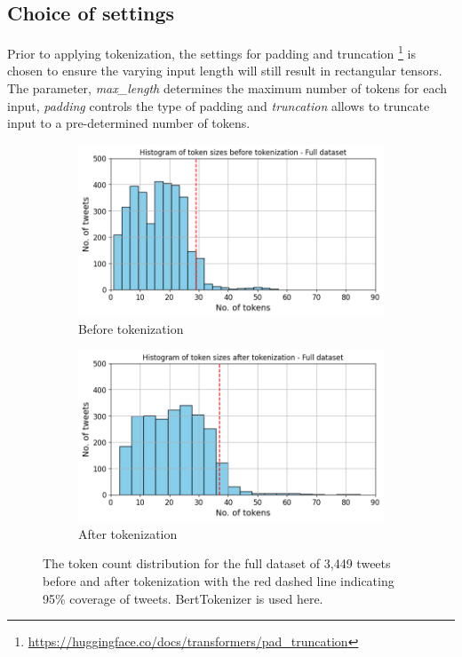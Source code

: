 \subsection{Choice of settings}
Prior to applying tokenization, the settings for padding and truncation \footnote{\url{https://huggingface.co/docs/transformers/pad_truncation}} is chosen to ensure the varying input length will still result in rectangular tensors. The parameter, \textit{max\_length} determines the maximum number of tokens for each input, \textit{padding} controls the type of padding and \textit{truncation} allows to truncate input to a pre-determined number of tokens.\newline

\begin{figure}[htbp]
    \centering
    \captionsetup{font=small}
    \begin{subfigure}[b]{0.48\textwidth}
        \includegraphics[width=\textwidth]{figures/token_hist.png}
        \caption{Before tokenization}
        \label{fig: token_hist}
    \end{subfigure}
    \hfill
    \begin{subfigure}[b]{0.48\textwidth}
        \includegraphics[width=\textwidth]{figures/token_pp_hist.png}
        \caption{After tokenization}
        \label{fig: token_pp_hist}
    \end{subfigure}
    \caption{The token count distribution for the full dataset of 3,449 tweets before and after tokenization with the red dashed line indicating 95\% coverage of tweets. BertTokenizer is used here.}
    \label{fig: bef_aft_token}
\end{figure}

